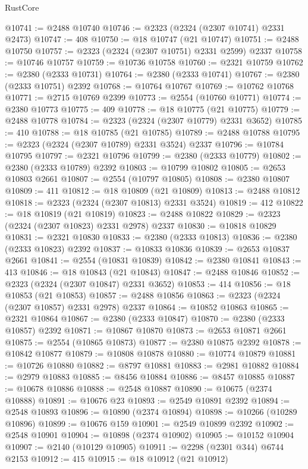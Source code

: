\begin{lexlean}{RustCore}
\begin{coremodule}
@10741 := @2488 @10740
@10746 := @2323 (@2324 (@2307 @10741) @2331 @2473)
@10747 := 408
@10750 := @18 @10747 (@21 @10747)
@10751 := @2488 @10750
@10757 := @2323 (@2324 (@2307 @10751) @2331 @2599) @2337
@10758 := @10746 @10757
@10759 := @10736 @10758
@10760 := @2321 @10759
@10762 := @2380 (@2333 @10731)
@10764 := @2380 (@2333 @10741)
@10767 := @2380 (@2333 @10751) @2392
@10768 := @10764 @10767
@10769 := @10762 @10768
@10771 := @2715 @10769 @2399
@10773 := @2554 (@10760 @10771)
@10774 := @2380 @10773
@10775 := 409
@10778 := @18 @10775 (@21 @10775)
@10779 := @2488 @10778
@10784 := @2323 (@2324 (@2307 @10779) @2331 @3652)
@10785 := 410
@10788 := @18 @10785 (@21 @10785)
@10789 := @2488 @10788
@10795 := @2323 (@2324 (@2307 @10789) @2331 @3524) @2337
@10796 := @10784 @10795
@10797 := @2321 @10796
@10799 := @2380 (@2333 @10779)
@10802 := @2380 (@2333 @10789) @2392
@10803 := @10799 @10802
@10805 := @2653 @10803 @2661
@10807 := @2554 (@10797 @10805)
@10808 := @2380 @10807
@10809 := 411
@10812 := @18 @10809 (@21 @10809)
@10813 := @2488 @10812
@10818 := @2323 (@2324 (@2307 @10813) @2331 @3524)
@10819 := 412
@10822 := @18 @10819 (@21 @10819)
@10823 := @2488 @10822
@10829 := @2323 (@2324 (@2307 @10823) @2331 @2978) @2337
@10830 := @10818 @10829
@10831 := @2321 @10830
@10833 := @2380 (@2333 @10813)
@10836 := @2380 (@2333 @10823) @2392
@10837 := @10833 @10836
@10839 := @2653 @10837 @2661
@10841 := @2554 (@10831 @10839)
@10842 := @2380 @10841
@10843 := 413
@10846 := @18 @10843 (@21 @10843)
@10847 := @2488 @10846
@10852 := @2323 (@2324 (@2307 @10847) @2331 @3652)
@10853 := 414
@10856 := @18 @10853 (@21 @10853)
@10857 := @2488 @10856
@10863 := @2323 (@2324 (@2307 @10857) @2331 @2978) @2337
@10864 := @10852 @10863
@10865 := @2321 @10864
@10867 := @2380 (@2333 @10847)
@10870 := @2380 (@2333 @10857) @2392
@10871 := @10867 @10870
@10873 := @2653 @10871 @2661
@10875 := @2554 (@10865 @10873)
@10877 := @2380 @10875 @2392
@10878 := @10842 @10877
@10879 := @10808 @10878
@10880 := @10774 @10879
@10881 := @10726 @10880
@10882 := @8797 @10881
@10883 := @2981 @10882
@10884 := @2979 @10883
@10885 := @8456 @10884
@10886 := @8457 @10885
@10887 := @10678 @10886
@10888 := @2548 @10887
@10890 := @10675 (@2374 @10888)
@10891 := @10676 @23
@10893 := @2549 @10891 @2392
@10894 := @2548 @10893
@10896 := @10890 (@2374 @10894)
@10898 := @10266 (@10289 @10896)
@10899 := @10676 @159
@10901 := @2549 @10899 @2392
@10902 := @2548 @10901
@10904 := @10898 (@2374 @10902)
@10905 := @10152 @10904
@10907 := @2140 (@10129 @10905)
@10911 := @2298 (@2301 @344) @6744 @2153
@10912 := 415
@10915 := @18 @10912 (@21 @10912)

\end{coremodule}
\end{lexlean}
